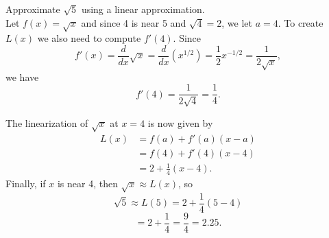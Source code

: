 \documentclass{ximera}
\begin{document}
 

\begin{example}[example 1]
Approximate $\sqrt{5}$ using a linear approximation.\\ 
Let $f(x) = \sqrt x$ and since 4 is near 5 and $\sqrt{4} = 2$, we let 
$a = 4$. To create $L(x)$ we also need to compute $f'(4)$. 
Since 
\[f'(x) = \frac{d}{dx} \sqrt x = \frac{d}{dx}(x^{1/2})= \frac{1}{2}x^{-1/2}   = \frac{1}{2\sqrt x},\] 
we have
\[f'(4) = \frac{1}{2\sqrt{4}} = \frac{1}{4}.\]

The linearization of $\sqrt x$ at $x=4$ is now given by
\begin{align*}
L(x) &= f(a) + f'(a)(x - a) \\
&= f(4) + f'(4)(x - 4) \\
&= 2 + \frac{1}{4}(x - 4).
\end{align*}
Finally, if $x$ is near 4, then $\sqrt x \approx L(x)$, so
\[\sqrt{5} \approx L(5) = 2 + \frac{1}{4}(5-4)\]
\[ = 2+ \frac{1}{4} = \frac{9}{4} = 2.25.\]
\end{example}


\begin{image}
\end{image}

 
\end{document}
